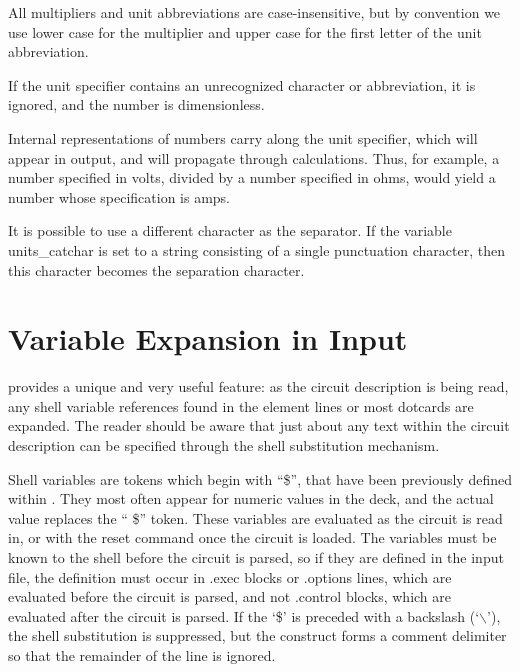 All multipliers and unit abbreviations are case-insensitive, but by
convention we use lower case for the multiplier and upper case for the
first letter of the unit abbreviation.

If the unit specifier contains an unrecognized character or
abbreviation, it is ignored, and the number is dimensionless.

Internal representations of numbers carry along the unit specifier,
which will appear in output, and will propagate through calculations. 
Thus, for example, a number specified in volts, divided by a number
specified in ohms, would yield a number whose specification is amps.

It is possible to use a different character as the separator.  If the
variable {\et units\_catchar} is set to a string consisting of a
single punctuation character, then this character becomes the
separation character.


\section{Variable Expansion in Input}

{\WRspice} provides a unique and very useful feature:  as the circuit
description is being read, any shell variable references found in the
element lines or most dotcards are expanded.  The reader should be
aware that just about any text within the circuit description can be
specified through the shell substitution mechanism.

Shell variables are tokens which begin with ``{\vt \$}'', that have
been previously defined within {\WRspice}.  They most often appear for
numeric values in the deck, and the actual value replaces the ``{\vt
\$}'' token.  These variables are evaluated as the circuit is read in,
or with the {\cb reset} command once the circuit is loaded.  The
variables must be known to the shell before the circuit is parsed, so
if they are defined in the input file, the definition must occur in
{\vt .exec} blocks or {\vt .options} lines, which are evaluated before
the circuit is parsed, and not {\vt .control} blocks, which are
evaluated after the circuit is parsed.  If the `{\vt \$}' is preceded
with a backslash (`$\backslash$'), the shell substitution is
suppressed, but the construct forms a comment delimiter so that the
remainder of the line is ignored.

